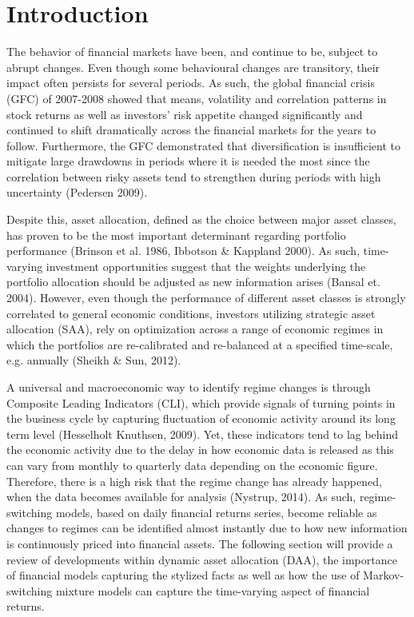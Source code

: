 \section{Introduction}
\label{section: introduction}
The behavior of financial markets have been, and continue to be, subject to abrupt changes. Even though some behavioural changes are transitory, their impact often persists for several periods. As such, the global financial crisis (GFC) of 2007-2008 showed that means, volatility and correlation patterns in stock returns as well as investors' risk appetite changed significantly and continued to shift dramatically across the financial markets for the years to follow. Furthermore, the GFC demonstrated that diversification is insufficient to mitigate large drawdowns in periods where it is needed the most since the correlation between risky assets tend to strengthen during periods with high uncertainty (Pedersen 2009). 

Despite this, asset allocation, defined as the choice between major asset classes, has proven to be the most important determinant regarding portfolio performance (Brinson et al. 1986, Ibbotson \& Kappland 2000). As such, time-varying investment opportunities suggest that the weights underlying the portfolio allocation should be adjusted as new information arises (Bansal et. 2004). However, even though the performance of different asset classes is strongly correlated to general economic conditions, investors utilizing strategic asset allocation (SAA), rely on optimization across a range of economic regimes in which the portfolios are re-calibrated and re-balanced at a specified time-scale, e.g. annually (Sheikh \& Sun, 2012).

A universal and macroeconomic way to identify regime changes is through Composite Leading Indicators (CLI), which provide signals of turning points in the business cycle by capturing fluctuation of economic activity around its long term level (Hesselholt Knuthsen, 2009). Yet, these indicators tend to lag behind the economic activity due to the delay in how economic data is released as this can vary from monthly to quarterly data depending on the economic figure. Therefore, there is a high risk that the regime change has already happened, when the data becomes available for analysis (Nystrup, 2014). As such, regime-switching models, based on daily financial returns series, become reliable as changes to regimes can be identified almost instantly due to how new information is continuously priced into financial assets. The following section will provide a review of developments within dynamic asset allocation (DAA), the importance of financial models capturing the stylized facts as well as how the use of Markov-switching mixture models can capture the time-varying aspect of financial returns. 

